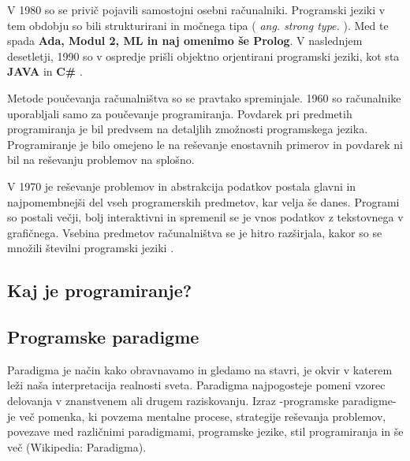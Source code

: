 V 1980 so se privič pojavili samostojni osebni računalniki. Programski
jeziki v tem obdobju so bili strukturirani in močnega tipa (
\emph{ang.  strong type.} ). Med te spada \textbf{Ada, Modul 2, ML in
  naj omenimo še Prolog}. V naslednjem desetletji, 1990 so v ospredje
prišli objektno orjentirani programski jeziki, kot sta \textbf{JAVA}
in \textbf{C\#} \cite{thesisAWebP}.



Metode poučevanja računalništva so se pravtako spreminjale. 1960 so
računalnike uporabljali samo za poučevanje programiranja. Povdarek pri
predmetih programiranja je bil predvsem na detaljlih zmožnosti
programskega jezika. Programiranje je bilo omejeno le na reševanje
enostavnih primerov in povdarek ni bil na reševanju problemov na
splošno.

V 1970 je reševanje problemov in abstrakcija podatkov postala glavni
in najpomembnejši del vseh programerskih predmetov, kar velja še
danes.  Programi so postali večji, bolj interaktivni in spremenil se
je vnos podatkov z tekstovnega v grafičnega. Vsebina predmetov
računalništva se je hitro razširjala, kakor so se množili številni
programski jeziki \cite{thesisAWebP}.


\subsection{Kaj je programiranje?}
\label{sec:kaj_je_programiranje}


\subsection{Programske paradigme}
\label{sec:programske_paradigme}

Paradigma je način kako obravnavamo in gledamo na stavri, je okvir v
katerem leži naša interpretacija realnosti sveta. Paradigma
najpogosteje pomeni vzorec delovanja v znanstvenem ali drugem
raziskovanju.  Izraz -programske paradigme- je več pomenka, ki povzema
mentalne procese, strategije reševanja problemov, povezave med
različnimi paradigmami, programske jezike, stil programiranja in še
več (Wikipedia: Paradigma).

